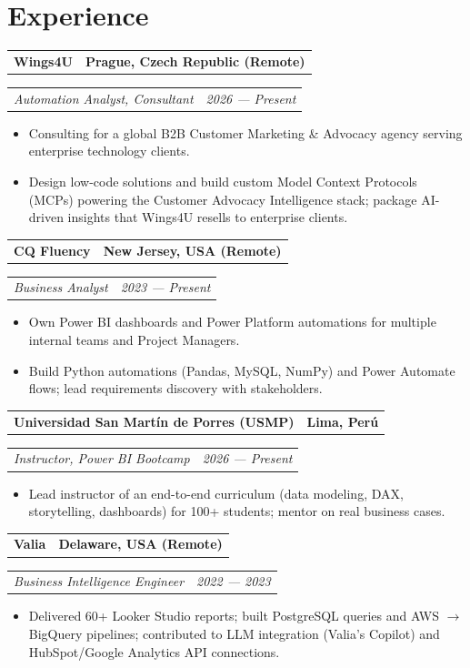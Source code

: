 \documentclass[10pt,letterpaper]{article}
\makeatletter
\newcommand{\entryhead}[2]{%
  \noindent\begin{tabularx}{\linewidth}{@{}X r@{}}
    \textbf{#1} & \textbf{#2}
  \end{tabularx}\par
}
\newcommand{\entryrole}[2]{%
  \noindent\begin{tabularx}{\linewidth}{@{}X r@{}}
    \textit{#1} & \textit{#2}
  \end{tabularx}\par\vspace{1pt}
}
\makeatother
\begin{document}
\section*{Experience}

\entryhead{Wings4U}{Prague, Czech Republic (Remote)}
\entryrole{Automation Analyst, Consultant}{2026 --- Present}
\begin{itemize}
  \item Consulting for a global B2B Customer Marketing \& Advocacy agency serving enterprise technology clients.
  \item Design low-code solutions and build custom Model Context Protocols (MCPs) powering the Customer Advocacy Intelligence stack; package AI-driven insights that Wings4U resells to enterprise clients.
\end{itemize}
\vspace{0pt}

\entryhead{CQ Fluency}{New Jersey, USA (Remote)}
\entryrole{Business Analyst}{2023 --- Present}
\begin{itemize}
  \item Own Power BI dashboards and Power Platform automations for multiple internal teams and Project Managers.
  \item Build Python automations (Pandas, MySQL, NumPy) and Power Automate flows; lead requirements discovery with stakeholders.
\end{itemize}
\vspace{0pt}

\entryhead{Universidad San Martín de Porres (USMP)}{Lima, Perú}
\entryrole{Instructor, Power BI Bootcamp}{2026 --- Present}
\begin{itemize}
  \item Lead instructor of an end-to-end curriculum (data modeling, DAX, storytelling, dashboards) for 100+ students; mentor on real business cases.
\end{itemize}
\vspace{0pt}

\entryhead{Valia}{Delaware, USA (Remote)}
\entryrole{Business Intelligence Engineer}{2022 --- 2023}
\begin{itemize}
  \item Delivered 60+ Looker Studio reports; built PostgreSQL queries and AWS $\rightarrow$ BigQuery pipelines; contributed to LLM integration (Valia's Copilot) and HubSpot/Google Analytics API connections.
\end{itemize}
\vspace{0pt}
\end{document}
